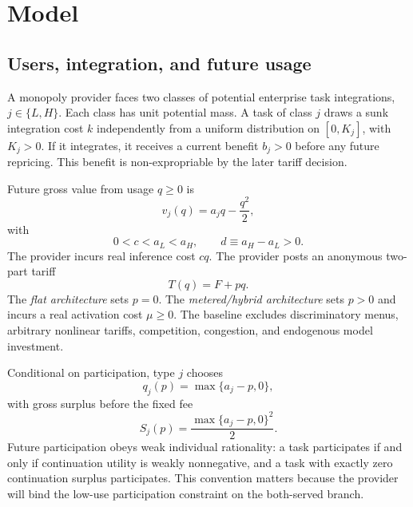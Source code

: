 \section{Model}\label{sec:model}

\subsection{Users, integration, and future usage}

A monopoly provider faces two classes of potential enterprise task integrations, $j\in\{L,H\}$. Each class has unit potential mass. A task of class $j$ draws a sunk integration cost $k$ independently from a uniform distribution on $[0,K_j]$, with $K_j>0$. If it integrates, it receives a current benefit $b_j>0$ before any future repricing. This benefit is non-expropriable by the later tariff decision.

Future gross value from usage $q\geq0$ is
\begin{equation}
 v_j(q)=a_jq-\frac{q^2}{2},
 \label{eq:utility}
\end{equation}
with
\begin{equation}
 0<c<a_L<a_H,
 \qquad d\equiv a_H-a_L>0.
 \label{eq:primitive-order}
\end{equation}
The provider incurs real inference cost $cq$. The provider posts an anonymous two-part tariff
\begin{equation}
 T(q)=F+pq.
 \label{eq:tariff}
\end{equation}
The \emph{flat architecture} sets $p=0$. The \emph{metered/hybrid architecture} sets $p>0$ and incurs a real activation cost $\mu\geq0$. The baseline excludes discriminatory menus, arbitrary nonlinear tariffs, competition, congestion, and endogenous model investment.

Conditional on participation, type $j$ chooses
\begin{equation}
 q_j(p)=\max\{a_j-p,0\},
 \label{eq:demand}
\end{equation}
with gross surplus before the fixed fee
\begin{equation}
 S_j(p)=\frac{\max\{a_j-p,0\}^2}{2}.
 \label{eq:indirect-surplus}
\end{equation}
Future participation obeys weak individual rationality: a task participates if and only if continuation utility is weakly nonnegative, and a task with exactly zero continuation surplus participates. This convention matters because the provider will bind the low-use participation constraint on the both-served branch.

